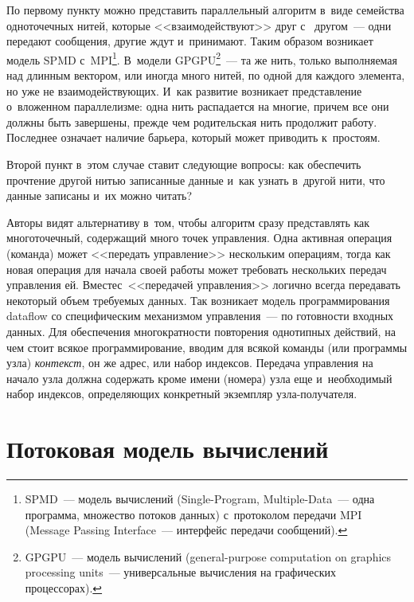 \begin{multicols}{2}
  По первому пункту можно представить параллельный алгоритм в~виде 
семейства одноточечных нитей, которые <<взаимодействуют>> друг с~
другом~--- одни передают сообщения, другие ждут и~принимают. Таким 
образом возникает модель SPMD с~MPI\footnote[6]{SPMD~--- модель вычислений (Single-Program, 
Multiple-Data~--- одна программа, множество потоков данных) с~протоколом передачи MPI (Message Passing 
Interface~--- интерфейс передачи сообщений).}. 
В~модели GPGPU\footnote[7]{GPGPU~--- 
модель вычислений (general-purpose computation on graphics processing units~--- универсальные вычисления на 
графических процессорах).}~--- та же нить, только выполняемая над длинным 
вектором, или иногда много нитей, по одной для каждого элемента, но уже не 
взаимодействующих. И~как развитие возникает представление о~вложенном 
параллелизме: одна нить распадается на многие, причем все они должны быть 
завершены, прежде чем родительская нить продолжит работу. Последнее 
означает наличие барьера, который может приводить к~простоям.
{ 

}


  
  Второй пункт в~этом случае ставит следующие вопросы: как обеспечить 
прочтение другой нитью записанные данные и~как узнать в~другой нити, что 
данные записаны и~их можно читать?
  
  Авторы видят альтернативу в~том, чтобы алгоритм сразу представлять как 
многоточечный, содержа\-щий много точек управ\-ле\-ния. Одна активная операция 
(команда) может <<передать управ\-ле\-ние>> нескольким операциям, тогда как 
новая операция для начала своей работы может требовать нескольких передач 
управления ей. Вместе\linebreak с~<<передачей управления>> логично всегда передавать 
некоторый объем требуемых данных. Так возникает модель программирования 
dataflow со специфическим механизмом управления~--- по готовности входных 
данных. Для обеспечения многократности повторения однотипных действий, на 
чем стоит всякое программирование, вводим для всякой команды (или 
программы узла) \textit{контекст}, он же адрес, или набор индексов. Передача 
управления на начало узла должна содержать кроме имени (номера) узла еще 
и~необходимый набор индексов, опре\-де\-ля\-ющих конкретный экземпляр  
уз\-ла-по\-лу\-ча\-теля.
{ %

}


  
\section{Потоковая модель вычислений}


\end{multicols}
